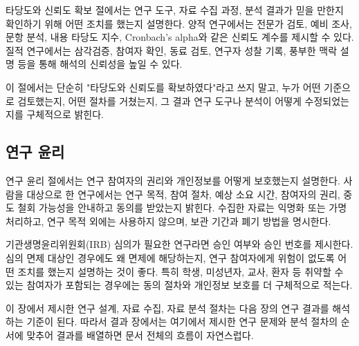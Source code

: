 
타당도와 신뢰도 확보 절에서는 연구 도구, 자료 수집 과정, 분석 결과가 믿을 만한지 확인하기 위해 어떤 조치를 했는지 설명한다.
양적 연구에서는 전문가 검토, 예비 조사, 문항 분석, 내용 타당도 지수, Cronbach's alpha와 같은 신뢰도 계수를 제시할 수 있다.
질적 연구에서는 삼각검증, 참여자 확인, 동료 검토, 연구자 성찰 기록, 풍부한 맥락 설명 등을 통해 해석의 신뢰성을 높일 수 있다.

이 절에서는 단순히 "타당도와 신뢰도를 확보하였다"라고 쓰지 말고, 누가 어떤 기준으로 검토했는지, 어떤 절차를 거쳤는지, 그 결과 연구 도구나 분석이 어떻게 수정되었는지를 구체적으로 밝힌다.

\subsection{연구 윤리}


연구 윤리 절에서는 연구 참여자의 권리와 개인정보를 어떻게 보호했는지 설명한다.
사람을 대상으로 한 연구에서는 연구 목적, 참여 절차, 예상 소요 시간, 참여자의 권리, 중도 철회 가능성을 안내하고 동의를 받았는지 밝힌다.
수집한 자료는 익명화 또는 가명 처리하고, 연구 목적 외에는 사용하지 않으며, 보관 기간과 폐기 방법을 명시한다.

기관생명윤리위원회(IRB) 심의가 필요한 연구라면 승인 여부와 승인 번호를 제시한다.
심의 면제 대상인 경우에도 왜 면제에 해당하는지, 연구 참여자에게 위험이 없도록 어떤 조치를 했는지 설명하는 것이 좋다.
특히 학생, 미성년자, 교사, 환자 등 취약할 수 있는 참여자가 포함되는 경우에는 동의 절차와 개인정보 보호를 더 구체적으로 적는다.

이 장에서 제시한 연구 설계, 자료 수집, 자료 분석 절차는 다음 장의 연구 결과를 해석하는 기준이 된다.
따라서 결과 장에서는 여기에서 제시한 연구 문제와 분석 절차의 순서에 맞추어 결과를 배열하면 문서 전체의 흐름이 자연스럽다.
